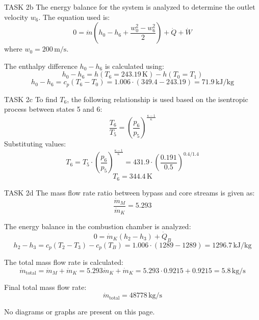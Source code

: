 TASK 2b  
The energy balance for the system is analyzed to determine the outlet velocity \( w_6 \). The equation used is:  
\[
0 = \dot{m} \left( h_0 - h_6 + \frac{w_0^2 - w_6^2}{2} \right) + \dot{Q} + \dot{W}
\]  
where \( w_0 = 200 \, \text{m/s} \).  

The enthalpy difference \( h_0 - h_6 \) is calculated using:  
\[
h_0 - h_6 = h(T_6 = 243.19 \, \text{K}) - h(T_0 = T_1)
\]  
\[
h_0 - h_6 = c_p (T_6 - T_0) = 1.006 \cdot (349.4 - 243.19) = 71.9 \, \text{kJ/kg}
\]  

TASK 2c  
To find \( T_6 \), the following relationship is used based on the isentropic process between states 5 and 6:  
\[
\frac{T_6}{T_5} = \left( \frac{p_6}{p_5} \right)^{\frac{\kappa - 1}{\kappa}}
\]  
Substituting values:  
\[
T_6 = T_5 \cdot \left( \frac{p_6}{p_5} \right)^{\frac{\kappa - 1}{\kappa}} = 431.9 \cdot \left( \frac{0.191}{0.5} \right)^{0.4 / 1.4}
\]  
\[
T_6 = 344.4 \, \text{K}
\]  

TASK 2d  
The mass flow rate ratio between bypass and core streams is given as:  
\[
\frac{\dot{m}_M}{\dot{m}_K} = 5.293
\]  

The energy balance in the combustion chamber is analyzed:  
\[
0 = \dot{m}_K (h_2 - h_3) + \dot{Q}_B
\]  
\[
h_2 - h_3 = c_p (T_2 - T_3) - c_p (T_B) = 1.006 \cdot (1289 - 1289) = 1296.7 \, \text{kJ/kg}
\]  

The total mass flow rate is calculated:  
\[
\dot{m}_\text{total} = \dot{m}_M + \dot{m}_K = 5.293 \dot{m}_K + \dot{m}_K = 5.293 \cdot 0.9215 + 0.9215 = 5.8 \, \text{kg/s}
\]  

Final total mass flow rate:  
\[
\dot{m}_\text{total} = 48778 \, \text{kg/s}
\]  

No diagrams or graphs are present on this page.